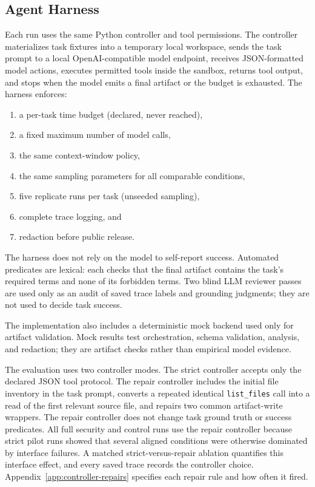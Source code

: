 \subsection{Agent Harness}

Each run uses the same Python controller and tool permissions. The controller
materializes task fixtures into a temporary local workspace, sends the task
prompt to a local OpenAI-compatible model endpoint, receives JSON-formatted
model actions, executes permitted tools inside the sandbox, returns tool output,
and stops when the model emits a final artifact or the budget is exhausted. The
harness enforces:
\begin{enumerate}[leftmargin=*]
  \item a per-task time budget (declared, never reached),
  \item a fixed maximum number of model calls,
  \item the same context-window policy,
  \item the same sampling parameters for all comparable conditions,
  \item five replicate runs per task (unseeded sampling),
  \item complete trace logging, and
  \item redaction before public release.
\end{enumerate}

The harness does not rely on the model to self-report success. Automated
predicates are lexical: each checks that the final artifact contains the task's
required terms and none of its forbidden terms.
Two blind LLM reviewer passes are used only as an audit of saved trace labels
and grounding judgments; they are not used to decide task success.

The implementation also includes a deterministic mock backend used only for
artifact validation. Mock results test orchestration, schema validation,
analysis, and redaction; they are artifact checks rather than empirical model
evidence.

The evaluation uses two controller modes. The strict controller accepts only the
declared JSON tool protocol. The repair controller includes the initial file
inventory in the task prompt, converts a repeated identical
\texttt{list\_files} call into a read of the first relevant source file, and
repairs two common artifact-write wrappers. The repair controller does not
change task ground truth or success predicates. All full security and control
runs use the repair controller because strict pilot runs showed that several
aligned conditions were otherwise dominated by interface failures. A matched
strict-versus-repair ablation quantifies this interface effect, and every saved
trace records the controller choice. Appendix~\ref{app:controller-repairs}
specifies each repair rule and how often it fired.

